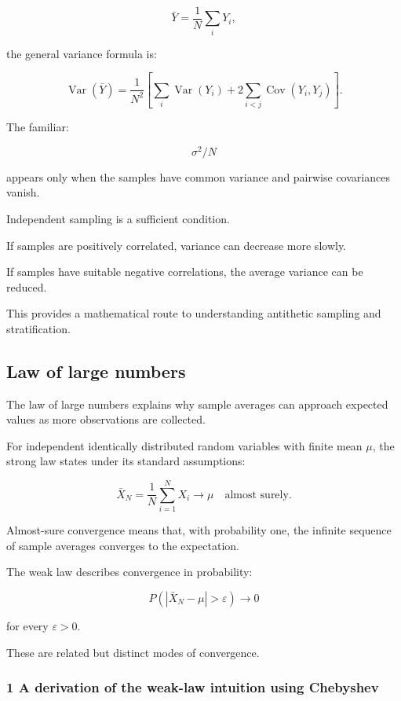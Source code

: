 \[
 \bar Y=\frac1N\sum_iY_i,
\]

the general variance formula is:

\[
 \boxed{ \operatorname{Var}(\bar Y) = \frac1{N^2} \left[ \sum_i\operatorname{Var}(Y_i) + 2\sum_{i<j}\operatorname{Cov}(Y_i,Y_j) \right] }.
\]

The familiar:

\[
 \sigma^2/N
\]

appears only when the samples have common variance and pairwise covariances vanish.

Independent sampling is a sufficient condition.

If samples are positively correlated, variance can decrease more slowly.

If samples have suitable negative correlations, the average variance can be reduced.

This provides a mathematical route to understanding antithetic sampling and stratification.

\subsection{Law of large numbers}\label{02-foundations-ii-ch030-law-of-large-numbers}

\hypertarget{02-foundations-ii-ch030-law-of-large-numbers}{}

The law of large numbers explains why sample averages can approach expected values as more observations are collected.

For independent identically distributed random variables with finite mean \(\mu\), the strong law states under its standard assumptions:

\[
 \boxed{ \bar X_N= \frac1N\sum_{i=1}^NX_i \longrightarrow\mu \quad\text{almost surely} }.
\]

Almost-sure convergence means that, with probability one, the infinite sequence of sample averages converges to the expectation.

The weak law describes convergence in probability:

\[
 \boxed{ P(|\bar X_N-\mu|>\varepsilon) \longrightarrow0 }
\]

for every \(\varepsilon>0\).

These are related but distinct modes of convergence.

\subsubsection{1 A derivation of the weak-law intuition using Chebyshev}\label{02-foundations-ii-ch030-a-derivation-of-the-weak-law-intuition-using-chebyshev}

